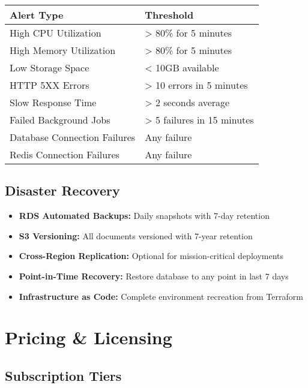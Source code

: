 \documentclass[11pt,a4paper]{article}
\begin{document}
\begin{table}[H]
\centering
\begin{tabular}{p{6cm}p{8cm}}
\toprule
\textbf{Alert Type} & \textbf{Threshold} \\
\midrule
High CPU Utilization & > 80\% for 5 minutes \\
High Memory Utilization & > 80\% for 5 minutes \\
Low Storage Space & < 10GB available \\
HTTP 5XX Errors & > 10 errors in 5 minutes \\
Slow Response Time & > 2 seconds average \\
Failed Background Jobs & > 5 failures in 15 minutes \\
Database Connection Failures & Any failure \\
Redis Connection Failures & Any failure \\
\bottomrule
\end{tabular}
\end{table}

\subsection{Disaster Recovery}

\begin{itemize}[leftmargin=*, itemsep=0.3em]
    \item \textbf{RDS Automated Backups:} Daily snapshots with 7-day retention
    \item \textbf{S3 Versioning:} All documents versioned with 7-year retention
    \item \textbf{Cross-Region Replication:} Optional for mission-critical deployments
    \item \textbf{Point-in-Time Recovery:} Restore database to any point in last 7 days
    \item \textbf{Infrastructure as Code:} Complete environment recreation from Terraform
\end{itemize}

\newpage

\section{Pricing \& Licensing}

\subsection{Subscription Tiers}
\end{document}
